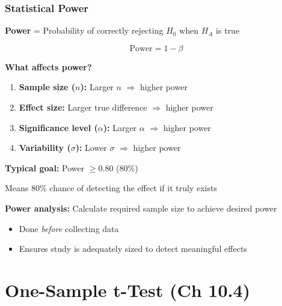 \documentclass{beamer}
\begin{document}
\begin{frame}
\frametitle{Statistical Power}
\textbf{Power} = Probability of correctly rejecting $H_0$ when $H_A$ is true

$$\text{Power} = 1 - \beta$$

\vspace{0.5cm}
\textbf{What affects power?}
\begin{enumerate}
\item \textbf{Sample size ($n$):} Larger $n$ $\Rightarrow$ higher power
\item \textbf{Effect size:} Larger true difference $\Rightarrow$ higher power
\item \textbf{Significance level ($\alpha$):} Larger $\alpha$ $\Rightarrow$ higher power
\item \textbf{Variability ($\sigma$):} Lower $\sigma$ $\Rightarrow$ higher power
\end{enumerate}

\vspace{0.3cm}
\textbf{Typical goal:} Power $\geq 0.80$ (80\%)

\vspace{0.1cm}
Means 80\% chance of detecting the effect if it truly exists

\vspace{0.3cm}
\textbf{Power analysis:} Calculate required sample size to achieve desired power
\begin{itemize}
\item Done \textit{before} collecting data
\item Ensures study is adequately sized to detect meaningful effects
\end{itemize}
\end{frame}

\section{One-Sample t-Test (Ch 10.4)}
\end{document}
